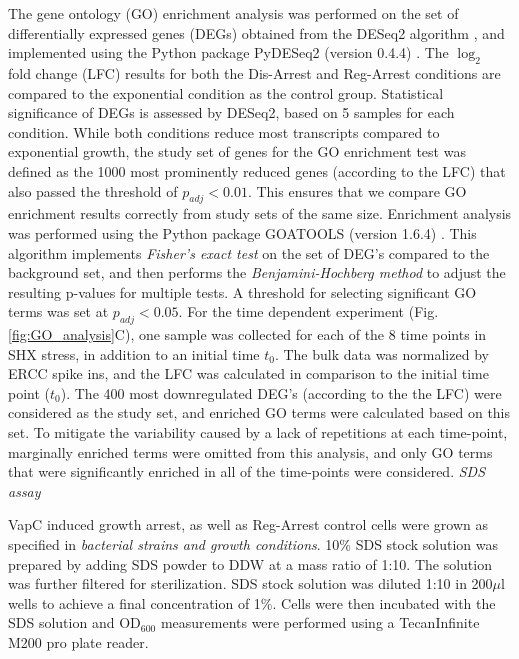 \documentclass[12pt]{article}
\begin{document}
The gene ontology (GO) enrichment analysis was performed on the set of differentially expressed genes (DEGs) obtained from the DESeq2 algorithm \cite{Love2014}, and implemented using the Python package PyDESeq2 (version 0.4.4) \cite{muzellec2023pydeseq2}. The $\log_2$ fold change (LFC) results for both the Dis-Arrest and Reg-Arrest conditions are compared to the exponential condition as the control group. Statistical significance of DEGs is assessed by DESeq2, based on 5 samples for each condition. While both conditions reduce most transcripts compared to exponential growth, the study set of genes for the GO enrichment test was defined as the 1000 most prominently reduced genes (according to the LFC) that also passed the threshold of $p_{adj}<0.01$. This ensures that we compare GO enrichment results correctly from study sets of the same size. Enrichment analysis was performed using the Python package GOATOOLS (version 1.6.4) \cite{Klopfenstein2018}. This algorithm implements \textit{Fisher's exact test} \cite{fisher1922} on the set of DEG's compared to the background set, and then performs the \textit{Benjamini-Hochberg method} \cite{benjamini-hochberg1995} to adjust the resulting p-values for multiple tests. A threshold for selecting significant GO terms was set at $p_{adj}<0.05$. For the time dependent experiment (Fig. \ref{fig:GO_analysis}C), one sample was collected for each of the 8 time points in SHX stress, in addition to an initial time $t_0$. The bulk data was normalized by ERCC spike ins, and the LFC was calculated in comparison to the initial time point ($t_0$). The 400 most downregulated DEG's (according to the the LFC) were considered as the study set, and enriched GO terms were calculated based on this set. To mitigate the variability caused by a lack of repetitions at each time-point, marginally enriched terms were omitted from this analysis, and only GO terms that were significantly enriched in all of the time-points were considered.
\vspace{0.5cm}
\newline
\textit{SDS assay}
\par
VapC induced growth arrest, as well as Reg-Arrest control cells were grown as specified in \textit{bacterial strains and growth conditions}. 10\% SDS stock solution was prepared by adding SDS powder to DDW at a mass ratio of 1:10. The solution was further filtered for sterilization. SDS stock solution was diluted 1:10 in 200$\mu$l wells to achieve a final concentration of 1\%. Cells were then incubated with the SDS solution and OD$_{600}$ measurements were performed using a Tecan\texttrademark Infinite M200 pro plate reader.
\end{document}
